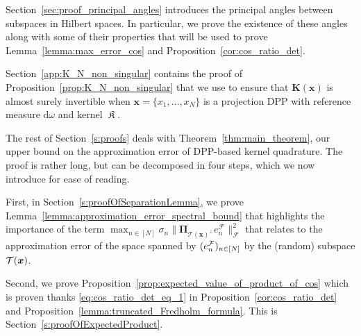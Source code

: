 \documentclass[twoside,11pt]{book}
\numberwithin{theorem}{chapter}
\numberwithin{definition}{chapter}
\numberwithin{proposition}{chapter}
\numberwithin{corollary}{chapter}
\numberwithin{example}{chapter}
\numberwithin{lemma}{chapter}
\numberwithin{assumption}{chapter}
\numberwithin{equation}{chapter}
\numberwithin{figure}{chapter}
\DeclareMathOperator*{\KDPP}{\mathfrak{K}}
\begin{document}
Section~\ref{sec:proof_principal_angles}  introduces the principal angles between subspaces in Hilbert spaces. In particular, we prove the existence of these angles along with some of their properties that will be used to prove Lemma~\ref{lemma:max_error_cos} and Proposition~\ref{cor:cos_ratio_det}.

Section~\ref{app:K_N_non_singular} contains the proof of Proposition~\ref{prop:K_N_non_singular} that we use to ensure that $\bm{K}(\bm{x})$ is almost surely invertible when $\bm{x} = \{x_{1}, \dots , x_{N}\}$ is a projection DPP with reference measure $\mathrm{d}\omega$ and kernel $\KDPP$. 


The rest of Section~\ref{s:proofs} deals with Theorem~\ref{thm:main_theorem}, our upper bound on the approximation error of DPP-based kernel quadrature. The proof is rather long, but can be decomposed in four steps, which we now introduce for ease of reading.

First, in Section~\ref{s:proofOfSeparationLemma}, we prove Lemma~\ref{lemma:approximation_error_spectral_bound} that highlights the importance of the term $\max_{n \in [N]} \sigma_{n} \|\bm{\Pi}_{\mathcal{T}(\bm{x})^{\perp}} e_{n}^{\mathcal{F}}\|_{\mathcal{F}}^{2}$ that relates to the approximation error of the space spanned by $(e^{\cal F}_n)_{n\in[N]}$ by the (random) subspace ${\cal T}(\bm{x})$. 



Second, we prove Proposition~\ref{prop:expected_value_of_product_of_cos}
 which is proven thanks  \eqref{eq:cos_ratio_det_eq_1} in Proposition~\ref{cor:cos_ratio_det}  and Proposition~\ref{lemma:truncated_Fredholm_formula}. This is Section~\ref{s:proofOfExpectedProduct}.
\end{document}
